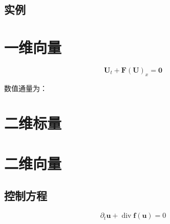 \documentclass{book}
\begin{document}
\subsection{实例}






\section{一维向量}

\begin{equation}
    \mathbf{U}_{t}+\mathbf{F}(\mathbf{U})_{x}=\mathbf{0}
\end{equation}

数值通量为：

\section{二维标量}

\section{二维向量}
\subsection{控制方程}
\begin{equation}
    \partial_{t} \boldsymbol{u}+\operatorname{div} \boldsymbol{f} (\boldsymbol{u})=0
\end{equation}
\end{document}
